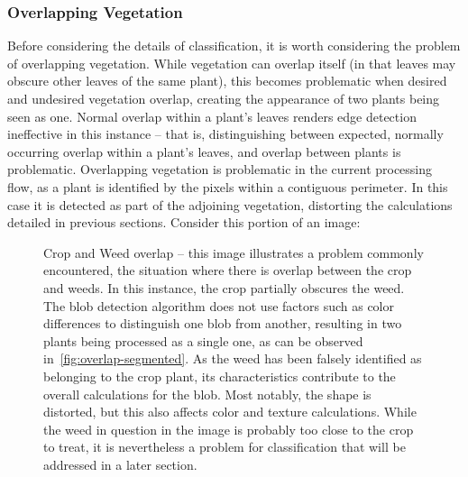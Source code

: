 \documentclass[letterpaper, notitlepage]{report}
\begin{document}
\subsubsection{Overlapping Vegetation}
\label{problem-overlap}

Before considering the details of classification, it is worth considering the problem of overlapping vegetation. While vegetation can overlap itself (in that leaves may obscure other leaves of the same plant), this becomes problematic when desired and undesired vegetation overlap, creating the appearance of two plants being seen as one. Normal overlap within a plant's leaves renders edge detection ineffective in this instance -- that is, distinguishing between expected, normally occurring overlap within a plant's leaves, and overlap between plants is problematic. Overlapping vegetation is problematic in the current processing flow, as a plant is identified by the pixels within a contiguous  perimeter. In this case it is detected as part of the adjoining vegetation, distorting the calculations detailed in previous sections.  Consider this portion of an image:

\begin{figure}[h]
	\centering
	\hfill
	\caption[Crop and Weed overlap]{Crop and Weed overlap -- this image illustrates a problem commonly encountered, the situation where there is overlap between the crop and weeds. In this instance, the crop partially obscures the weed. The blob detection algorithm does not use factors such as color differences to distinguish one blob from another, resulting in two plants being processed as a single one, as can be observed in~\ref{fig:overlap-segmented}. As the weed has been falsely identified as belonging to the crop plant, its characteristics contribute to the overall calculations for the blob. Most notably, the shape is distorted, but this also affects color and texture calculations. While the weed in question in the image is probably too close to the crop to treat, it is nevertheless a problem for classification that will be addressed in a later section.}
	\label{fig:overlap}
\end{figure}
\end{document}
